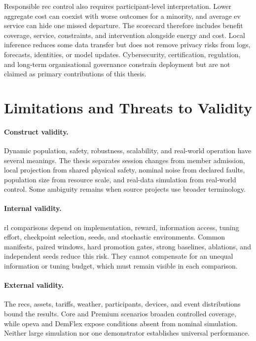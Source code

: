 Responsible \gls{rec} control also requires participant-level interpretation. Lower aggregate cost can coexist with worse outcomes for a minority, and average \gls{ev} service can hide one missed departure. The scorecard therefore includes benefit coverage, service, constraints, and intervention alongside energy and cost. Local inference reduces some data transfer but does not remove privacy risks from logs, forecasts, identities, or model updates. Cybersecurity, certification, regulation, and long-term organisational governance constrain deployment but are not claimed as primary contributions of this thesis.

\section{Limitations and Threats to Validity}
\label{sec:discussion-validity}

\paragraph{Construct validity.}
Dynamic population, safety, robustness, scalability, and real-world operation have several meanings. The thesis separates session changes from member admission, local projection from shared physical safety, nominal noise from declared faults, population size from resource scale, and real-data simulation from real-world control. Some ambiguity remains when source projects use broader terminology.

\paragraph{Internal validity.}
\gls{rl} comparisons depend on implementation, reward, information access, tuning effort, checkpoint selection, seeds, and stochastic environments. Common manifests, paired windows, hard promotion gates, strong baselines, ablations, and independent seeds reduce this risk. They cannot compensate for an unequal information or tuning budget, which must remain visible in each comparison.

\paragraph{External validity.}
The \glspl{rec}, assets, tariffs, weather, participants, devices, and event distributions bound the results. Core and Premium scenarios broaden controlled coverage, while \gls{opeva} and DemFlex expose conditions absent from nominal simulation. Neither large simulation nor one demonstrator establishes universal performance.

